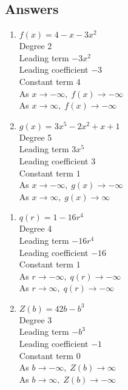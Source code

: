 \subsection{Answers}

\begin{multicols}{2}
\begin{enumerate}

\item $f(x) = 4-x-3x^2$ \\
Degree 2 \\
Leading term $-3x^{2}$\\
Leading coefficient $-3$\\
Constant term $4$\\
As $x \rightarrow -\infty, \; f(x) \rightarrow -\infty$\\
As $x \rightarrow \infty, \; f(x) \rightarrow -\infty$\\

\item  $g(x) = 3x^5 - 2x^2 + x + 1$ \\
Degree 5 \\
Leading term $3x^5$\\
Leading coefficient $3$\\
Constant term $1$\\
As $x \rightarrow -\infty, \; g(x) \rightarrow -\infty$\\
As $x \rightarrow \infty, \; g(x) \rightarrow \infty$\\


\setcounter{HW}{\value{enumi}}
\end{enumerate}
\end{multicols}

\begin{multicols}{2}
\begin{enumerate}
\setcounter{enumi}{\value{HW}}

\item $q(r) = 1 - 16r^{4}$\\
Degree 4 \\
Leading term $-16r^{4}$\\
Leading coefficient $-16$\\
Constant term $1$\\
As $r \rightarrow -\infty, \; q(r) \rightarrow -\infty$\\
As $r \rightarrow \infty, \; q(r) \rightarrow -\infty$\\

\item $Z(b) = 42b - b^{3}$\\
Degree 3 \\
Leading term $-b^{3}$\\
Leading coefficient $-1$\\
Constant term $0$\\
As $b \rightarrow -\infty, \; Z(b) \rightarrow \infty$\\
As $b \rightarrow \infty, \; Z(b) \rightarrow -\infty$\\

\setcounter{HW}{\value{enumi}}
\end{enumerate}
\end{multicols}

